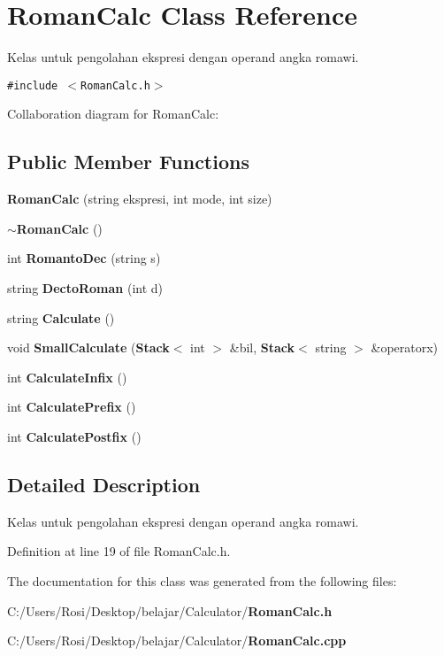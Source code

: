 \section{Roman\-Calc Class Reference}
\label{class_roman_calc}
Kelas untuk pengolahan ekspresi dengan operand angka romawi.  


{\tt \#include $<$Roman\-Calc.h$>$}

Collaboration diagram for Roman\-Calc:\subsection*{Public Member Functions}
\begin{CompactItemize}
\item 
{\bf Roman\-Calc} (string ekspresi, int mode, int size)\label{class_roman_calc_98bbd4d6af013fbb7f7f5e282c0057ec}

\item 
{\bf $\sim$Roman\-Calc} ()\label{class_roman_calc_f7ab50c87dc838fdc30f1622d55948fd}

\item 
int {\bf Romanto\-Dec} (string s)\label{class_roman_calc_24cf3d90b3810d31bbde7af678eb8f9e}

\item 
string {\bf Decto\-Roman} (int d)\label{class_roman_calc_907493780cf78dc8e85d999c1a7d5556}

\item 
string {\bf Calculate} ()\label{class_roman_calc_ef3b608a0cfab3929e1afe02afe9e580}

\item 
void {\bf Small\-Calculate} ({\bf Stack}$<$ int $>$ \&bil, {\bf Stack}$<$ string $>$ \&operatorx)\label{class_roman_calc_0f8f717719f6e76b6680f44bd81bbd9f}

\item 
int {\bf Calculate\-Infix} ()\label{class_roman_calc_39a440cd99043f8ef3809d8191620779}

\item 
int {\bf Calculate\-Prefix} ()\label{class_roman_calc_968d7f0f8876ad0fb9a25576e0f0e7c6}

\item 
int {\bf Calculate\-Postfix} ()\label{class_roman_calc_81d5c7f43d3de276cafd11096ec6204c}

\end{CompactItemize}


\subsection{Detailed Description}
Kelas untuk pengolahan ekspresi dengan operand angka romawi. 



Definition at line 19 of file Roman\-Calc.h.

The documentation for this class was generated from the following files:\begin{CompactItemize}
\item 
C:/Users/Rosi/Desktop/belajar/Calculator/{\bf Roman\-Calc.h}\item 
C:/Users/Rosi/Desktop/belajar/Calculator/{\bf Roman\-Calc.cpp}\end{CompactItemize}
